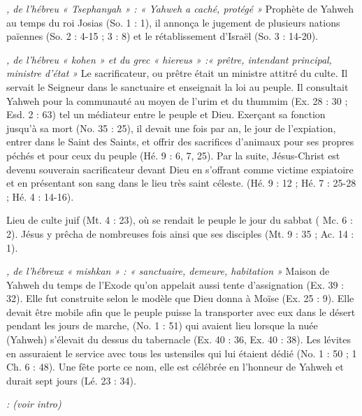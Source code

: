 \begin{multicols}{2}
\textit{, de l'hébreu « Tsephanyah » : « Yahweh a caché, protégé »}\newline
Prophète de Yahweh au temps du roi Josias (So. 1 : 1), il annonça le jugement de plusieurs nations païennes (So. 2 : 4-15 ; 3 : 8) et le rétablissement d'Israël (So. 3 : 14-20).

\textit{, de l'hébreu « kohen » et du grec « hiereus » :« prêtre, intendant principal, ministre d'état »}\newline
Le sacrificateur, ou prêtre était un ministre attitré du culte. Il servait le Seigneur dans le sanctuaire et enseignait la loi au peuple. Il consultait Yahweh pour la communauté au moyen de l'urim et du thummim (Ex. 28 : 30 ; Esd. 2 : 63) tel un médiateur entre le peuple et Dieu. Exerçant sa fonction jusqu'à sa mort (No. 35 : 25), il devait une fois par an, le jour de l'expiation, entrer dans le Saint des Saints, et offrir des sacrifices d'animaux pour ses propres péchés et pour ceux du peuple (Hé. 9 : 6, 7, 25). Par la suite, Jésus-Christ est devenu souverain sacrificateur devant Dieu en s'offrant comme victime expiatoire et en présentant son sang dans le lieu très saint céleste. (Hé. 9 : 12 ; Hé. 7 : 25-28 ; Hé. 4 : 14-16).

\textit{}\newline
Lieu de culte juif (Mt. 4 : 23), où se rendait le peuple le jour du sabbat ( Mc. 6 : 2). Jésus y prêcha de nombreuses fois ainsi que ses disciples (Mt. 9 : 35 ; Ac. 14 : 1).

\textit{, de l'hébreux « mishkan » : « sanctuaire, demeure, habitation »}\newline
Maison de Yahweh du temps de l'Exode qu'on appelait aussi tente d'assignation (Ex. 39 : 32). Elle fut construite selon le modèle que Dieu donna à Moïse (Ex. 25 : 9). Elle devait être mobile afin que le peuple puisse la transporter avec eux dans le désert pendant les jours de marche, (No. 1 : 51) qui avaient lieu lorsque la nuée (Yahweh) s'élevait du dessus du tabernacle (Ex. 40 : 36, Ex. 40 : 38). Les lévites en assuraient le service avec tous les ustensiles qui lui étaient dédié (No. 1 : 50 ; 1 Ch. 6 : 48). Une fête porte ce nom, elle est célébrée en l'honneur de Yahweh et durait sept jours (Lé. 23 : 34).

\textit{: (voir intro)}\newline


\end{multicols}
